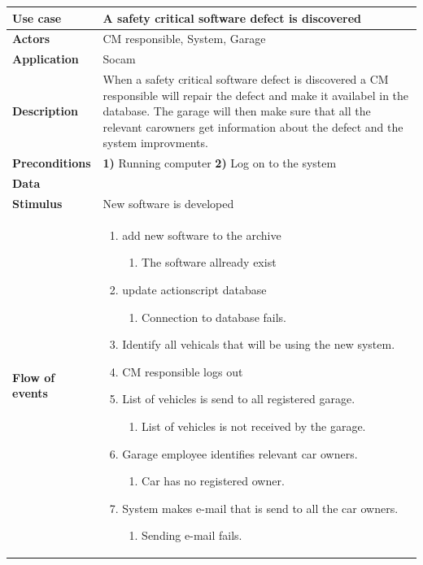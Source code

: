 	\begin{table}[H]
		\begin{tabular}{ p{4cm} | p{10cm} }
			\hline
			\rowcolor{gray}
			{\bf Use case} & {\bf A safety critical software defect is discovered} \\ \hline
			{\bf Actors} & CM responsible, System, Garage \\ \hline
			{\bf Application} & Socam \\ \hline
			{\bf Description} & When a safety critical software defect is discovered a CM 
			responsible will repair the defect and make it availabel in the database. 
			The garage will then make sure that all the relevant carowners get information 
			about the defect and the system improvments.\\ \hline
			{\bf Preconditions} & {\bf 1)} Running computer {\bf 2)} Log on to the system \\ \hline
			{\bf Data} & \\ \hline
			{\bf Stimulus} & New software is developed \\ \hline
			{\bf Flow of events} & 
				\begin{enumerate}[font=\bfseries]
					\item add new software to the archive
						\begin{enumerate}[label*=\arabic*., font=\bfseries]
							\item The software allready exist 
						\end{enumerate}
					\item update actionscript database
						\begin{enumerate}[label*=\arabic*., font=\bfseries]
							\item Connection to database fails. 
						\end{enumerate}
					\item Identify all vehicals that will be using the new system.
					\item CM responsible logs out
					\item List of vehicles is send to all registered garage.
						\begin{enumerate}[label*=\arabic*., font=\bfseries]
							\item  List of vehicles is not received by the garage.
						\end{enumerate}
					\item Garage employee identifies relevant car owners.
						\begin{enumerate}[label*=\arabic*., font=\bfseries]
							\item Car has no registered owner.
						\end{enumerate}
					\item System makes e-mail that is send to all the car owners.
						\begin{enumerate}[label*=\arabic*., font=\bfseries]
							\item Sending e-mail fails.
						\end{enumerate}
				\end{enumerate}
			

\end{tabular}
\end{table}
